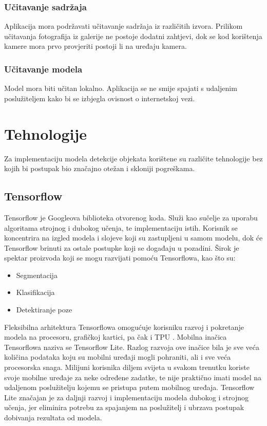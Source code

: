\subsubsection{Učitavanje sadržaja}
Aplikacija mora podržavati učitavanje sadržaja iz različitih izvora. Prilikom učitavanja fotografija iz galerije 
ne postoje dodatni zahtjevi, dok se kod korištenja kamere mora prvo provjeriti postoji li na uređaju kamera.
\subsubsection{Učitavanje modela}
Model mora biti učitan lokalno. Aplikacija se ne smije spajati s udaljenim poslužiteljem kako bi se izbjegla ovisnost o internetskoj vezi. 

\section{Tehnologije}
Za implementaciju modela detekcije objekata korištene su različite tehnologije bez kojih bi postupak bio značajno otežan i 
skloniji pogreškama.
\subsection{Tensorflow}
Tensorflow je Googleova biblioteka otvorenog koda. Služi kao sučelje za uporabu algoritama strojnog i dubokog učenja, te implementaciju
istih. Korisnik se koncentrira na izgled modela i slojeve koji su zastupljeni u samom
modelu, dok će Tensorflow brinuti za ostale postupke koji se događaju u pozadini. Širok je spektar proizvoda koji se mogu razvijati pomoću
Tensorflowa, kao što su: 
\begin{itemize}
    \item Segmentacija 
    \item Klasifikacija
    \item Detektiranje poze
\end{itemize}
Fleksibilna arhitektura Tensorflowa omogućuje korisniku razvoj i pokretanje modela
na procesoru, grafičkoj kartici, pa čak i TPU .
Mobilna inačica Tensorflowa naziva se Tensorflow Lite. 
Razlog razvoja ove inačice bila je sve veća količina podataka koju su mobilni uređaji 
mogli pohraniti, ali i sve veća procesorska snaga. Milijuni korisnika diljem svijeta u svakom 
trenutku koriste svoje mobilne uređaje za neke određene zadatke, te nije praktično imati model na 
udaljenom poslužitelju kojemu se pristupa putem mobilnog uređaja. Tensorflow Lite značajan je za daljnji razvoj i 
implementaciju modela dubokog i strojnog učenja, jer eliminira potrebu za spajanjem na poslužitelj i ubrzava postupak dobivanja
rezultata od modela. \citep{tensorflow2015-whitepaper}

